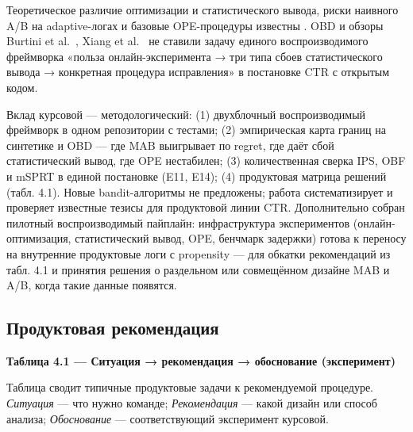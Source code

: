 Теоретическое различие оптимизации и статистического вывода, риски наивного A/B на adaptive-логах и базовые OPE-процедуры известны \cite{ref5,ref13,ref19,ref21,ref26}. OBD \cite{ref26} и обзоры Burtini et al.~\cite{ref13}, Xiang et al.~\cite{ref21} не ставили задачу единого воспроизводимого фреймворка «польза онлайн-эксперимента → три типа сбоев статистического вывода → конкретная процедура исправления» в постановке CTR с открытым кодом.

Вклад курсовой --- методологический: (1) двухблочный воспроизводимый фреймворк в одном репозитории с тестами; (2) эмпирическая карта границ на синтетике и OBD --- где MAB выигрывает по regret, где даёт сбой статистический вывод, где OPE нестабилен; (3) количественная сверка IPS, OBF и mSPRT в единой постановке (E11, E14); (4) продуктовая матрица решений (табл. 4.1). Новые bandit-алгоритмы не предложены; работа систематизирует и проверяет известные тезисы для продуктовой линии CTR. Дополнительно собран пилотный воспроизводимый пайплайн: инфраструктура экспериментов (онлайн-оптимизация, статистический вывод, OPE, бенчмарк задержки) готова к переносу на внутренние продуктовые логи с propensity --- для обкатки рекомендаций из табл. 4.1 и принятия решения о раздельном или совмещённом дизайне MAB и A/B, когда такие данные появятся.

\subsection{Продуктовая рекомендация}\label{ux43fux440ux43eux434ux443ux43aux442ux43eux432ux430ux44f-ux440ux435ux43aux43eux43cux435ux43dux434ux430ux446ux438ux44f}

\textbf{Таблица 4.1 --- Ситуация → рекомендация → обоснование (эксперимент)}

Таблица сводит типичные продуктовые задачи к рекомендуемой процедуре. \emph{Ситуация} --- что нужно команде; \emph{Рекомендация} --- какой дизайн или способ анализа; \emph{Обоснование} --- соответствующий эксперимент курсовой.

